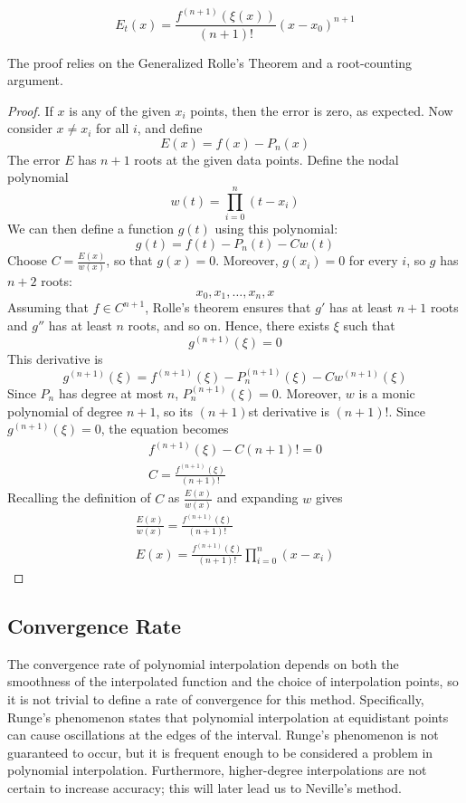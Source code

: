 \documentclass[12pt]{article}
\theoremstyle{plain}
\theoremstyle{remark}
\begin{document}
\[
  E_t(x) = \frac{f^{(n + 1)}(\xi(x))}{(n + 1)!}(x - x_0)^{n + 1}
\]

The proof relies on the Generalized Rolle's Theorem and a root-counting argument.

\begin{proof}
  If $x$ is any of the given $x_i$ points, then the error is zero, as expected. Now consider $x \ne x_i$ for all $i$, and define
  \[
    E(x) = f(x) - P_n(x)
  \]
  The error $E$ has $n + 1$ roots at the given data points. Define the nodal polynomial
  \[
    w(t) = \prod_{i = 0}^n (t - x_i)
  \]
  We can then define a function $g(t)$ using this polynomial:
  \[
    g(t) = f(t) - P_n(t) - Cw(t)
  \]
  Choose $C = \frac{E(x)}{w(x)}$, so that $g(x) = 0$. Moreover, $g(x_i) = 0$ for every $i$, so $g$ has $n + 2$ roots:
  \[
    x_0, x_1, \dots, x_n, x
  \]
  Assuming that $f \in C^{n + 1}$, Rolle's theorem ensures that $g'$ has at least $n + 1$ roots and $g''$ has at least $n$ roots, and so on. Hence, there exists $\xi$ such that
  \[
    g^{(n + 1)}(\xi) = 0
  \]
  This derivative is
  \[
    g^{(n + 1)}(\xi) = f^{(n + 1)}(\xi) - P_n^{(n + 1)}(\xi) - Cw^{(n + 1)}(\xi)
  \]
  Since $P_n$ has degree at most $n$, $P_n^{(n + 1)}(\xi) = 0$. Moreover, $w$ is a monic polynomial of degree $n + 1$, so its $(n + 1)$st derivative is $(n + 1)!$. Since $g^{(n + 1)}(\xi) = 0$, the equation becomes
  \begin{gather*}
    f^{(n + 1)}(\xi) - C(n + 1)! = 0 \\
    C = \frac{f^{(n + 1)}(\xi)}{(n + 1)!}
  \end{gather*}
  Recalling the definition of $C$ as $\frac{E(x)}{w(x)}$ and expanding $w$ gives
  \begin{gather*}
    \frac{E(x)}{w(x)} = \frac{f^{(n + 1)}(\xi)}{(n + 1)!} \\
    E(x) = \frac{f^{(n + 1)}(\xi)}{(n + 1)!} \prod_{i = 0}^n (x - x_i)
  \end{gather*}
\end{proof}

\subsection{Convergence Rate}\label{sec:convergence_rate}

The convergence rate of polynomial interpolation depends on both the smoothness of the interpolated function and the choice of interpolation points, so it is not trivial to define a rate of convergence for this method. Specifically, Runge's phenomenon states that polynomial interpolation at equidistant points can cause oscillations at the edges of the interval. Runge's phenomenon is not guaranteed to occur, but it is frequent enough to be considered a problem in polynomial interpolation. Furthermore, higher-degree interpolations are not certain to increase accuracy; this will later lead us to Neville's method.
\end{document}
